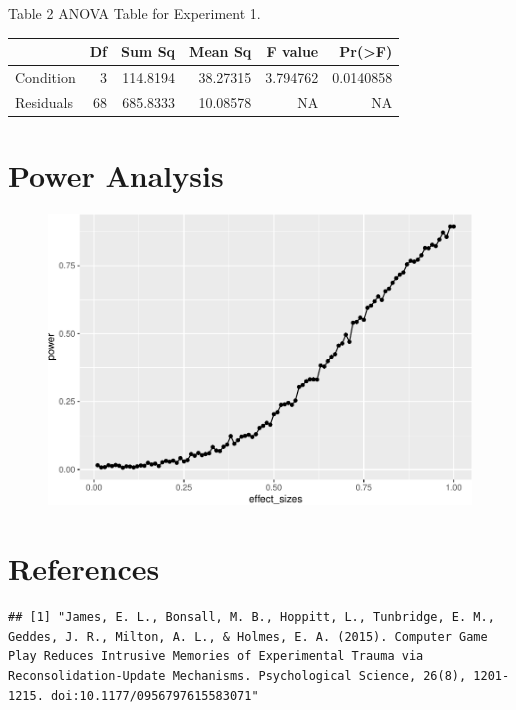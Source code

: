 \documentclass[man]{apa6}
\begin{document}
Table 2 ANOVA Table for Experiment 1.

\begin{tabular}{l|r|r|r|r|r}
\hline
  & Df & Sum Sq & Mean Sq & F value & Pr(>F)\\
\hline
Condition & 3 & 114.8194 & 38.27315 & 3.794762 & 0.0140858\\
\hline
Residuals & 68 & 685.8333 & 10.08578 & NA & NA\\
\hline
\end{tabular}

\section{Power Analysis}\label{power-analysis}

\begin{figure}
\centering
\includegraphics{testMidterm_files/figure-latex/unnamed-chunk-5-1.pdf}
\caption{}
\end{figure}

\newpage

\section{References}\label{references}

\begin{verbatim}
## [1] "James, E. L., Bonsall, M. B., Hoppitt, L., Tunbridge, E. M., Geddes, J. R., Milton, A. L., & Holmes, E. A. (2015). Computer Game Play Reduces Intrusive Memories of Experimental Trauma via Reconsolidation-Update Mechanisms. Psychological Science, 26(8), 1201-1215. doi:10.1177/0956797615583071"
\end{verbatim}

\begingroup
\setlength{\parindent}{-0.5in} \setlength{\leftskip}{0.5in}

\hypertarget{refs}{}

\endgroup
\end{document}
